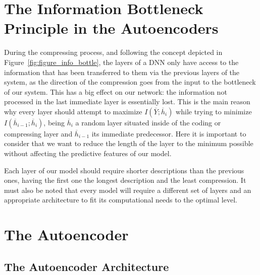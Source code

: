 \section{The Information Bottleneck Principle in the Autoencoders}

During the compressing process, and following the concept depicted in Figure~\ref{fig:figure_info_bottle}, the layers of a DNN only have access to the information that has been transferred to them via the previous layers of the system, as the direction of the compression goes from the input to the bottleneck of our system. This has a big effect on our network: the information not processed in the last immediate layer is essentially lost. This is the main reason why every layer should attempt to maximize $I(\overline Y;\overline h_i)$ while trying to minimize $I(\overline h_{i-1}; \overline h_i)$, being $\overline h_i$ a random layer situated inside of the coding or compressing layer and $\overline h_{i-1}$ its immediate predecessor. Here it is important to consider that we want to reduce the length of the layer to the minimum possible without affecting the predictive features of our model. \par

Each layer of our model should require shorter descriptions than the previous ones, having the first one the longest description and the least compression. It must also be noted that every model will require a different set of layers and an appropriate architecture to fit its computational needs to the optimal level. \par

\section{The Autoencoder}
\label{sec:ae}

\subsection{The Autoencoder Architecture}

